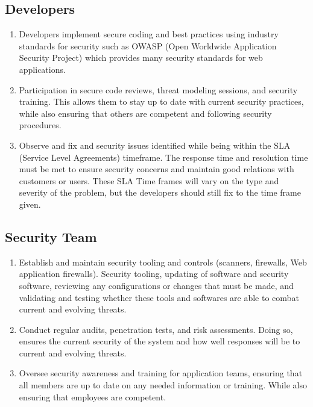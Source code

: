 \subsection{Developers}
\begin{enumerate}
    \item Developers implement secure coding and best practices using industry standards for security such as OWASP (Open Worldwide Application Security Project) which provides many security standards for web applications.
    \item Participation in secure code reviews, threat modeling sessions, and security training. This allows them to stay up to date with current security practices, while also ensuring that others are competent and following security procedures.
    \item Observe and fix and security issues identified while being within the SLA (Service Level Agreements) timeframe. The response time and resolution time must be met to ensure security concerns and maintain good relations with customers or users. These SLA Time frames will vary on the type and severity of the problem, but the developers should still fix to the time frame given.
\end{enumerate}
\subsection{Security Team}
\begin{enumerate}
    \item Establish and maintain security tooling and controls (scanners, firewalls, Web application firewalls).  Security tooling, updating of software and security software, reviewing any configurations or changes that must be made, and validating and testing whether these tools and softwares are able to combat current and evolving threats.
    \item Conduct regular audits, penetration tests, and risk assessments. Doing so, ensures the current security of the system and how well responses will be to current and evolving threats.
    \item Oversee security awareness and training for application teams, ensuring that all members are up to date on any needed information or training. While also ensuring that employees are competent.
\end{enumerate}
